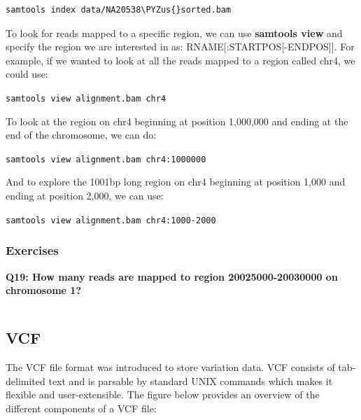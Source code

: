 \documentclass[11pt]{article}
\makeatletter
\def\PYZus{\char`\_}
\newcommand{\boxspacing}{\kern\kvtcb@left@rule\kern\kvtcb@boxsep}
\newcommand{\prompt}[4]{
        \ttfamily\llap{{\color{#2}\LARGE\faKeyboardO\hspace{3pt}#4}}\vspace{-\baselineskip}
    }
\makeatother
\begin{document}
    \begin{tcolorbox}[breakable, size=fbox, boxrule=1pt, pad at break*=1mm,colback=cellbackground, colframe=cellborder]
\prompt{In}{incolor}{ }{\boxspacing}
\begin{Verbatim}[commandchars=\\\{\}]
samtools index data/NA20538\PYZus{}sorted.bam
\end{Verbatim}
\end{tcolorbox}

    To look for reads mapped to a specific region, we can use
\textbf{samtools view} and specify the region we are interested in as:
RNAME{[}:STARTPOS{[}-ENDPOS{]}{]}. For example, if we wanted to look at
all the reads mapped to a region called chr4, we could use:

    \texttt{samtools\ view\ alignment.bam\ chr4}

    To look at the region on chr4 beginning at position 1,000,000 and ending
at the end of the chromosome, we can do:

    \texttt{samtools\ view\ alignment.bam\ chr4:1000000}

    And to explore the 1001bp long region on chr4 beginning at position
1,000 and ending at position 2,000, we can use:

    \texttt{samtools\ view\ alignment.bam\ chr4:1000-2000}

    \hypertarget{exercises}{%
\subsubsection{Exercises}\label{exercises}}

\textbf{Q19: How many reads are mapped to region 20025000-20030000 on
chromosome 1?}

    \begin{tcolorbox}[breakable, size=fbox, boxrule=1pt, pad at break*=1mm,colback=cellbackground, colframe=cellborder]
\prompt{In}{incolor}{ }{\boxspacing}
\begin{Verbatim}[commandchars=\\\{\}]

\end{Verbatim}
\end{tcolorbox}

    \hypertarget{vcf}{%
\subsection{VCF}\label{vcf}}

The VCF file format was introduced to store variation data. VCF consists
of tab-delimited text and is parsable by standard UNIX commands which
makes it flexible and user-extensible. The figure below provides an
overview of the different components of a VCF file:
\end{document}
